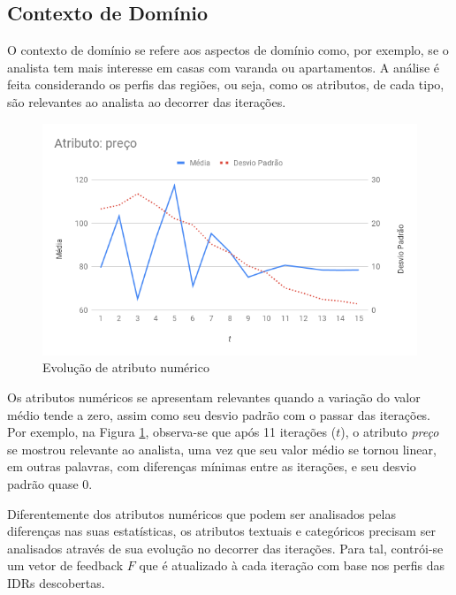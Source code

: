 
\subsection{Contexto de Domínio}

O contexto de domínio se refere aos aspectos de domínio como, por exemplo, se o analista tem mais interesse em casas com varanda ou apartamentos. A análise é feita considerando os perfis das regiões, ou seja, como os atributos, de cada tipo, são relevantes ao analista ao decorrer das iterações.

\begin{figure}[]
	\centering
	\includegraphics[width=\textwidth]{imagens/analise-atributo-numerico}
	\caption{Evolução de atributo numérico}
	\label{fig:analise-atributo-numerico}
\end{figure}

Os atributos numéricos se apresentam relevantes quando a variação do valor médio tende a zero, assim como seu desvio padrão com o passar das iterações. Por exemplo, na Figura \ref{fig:analise-atributo-numerico}, observa-se que após 11 iterações ($t$), o atributo {\em preço} se mostrou relevante ao analista, uma vez que seu valor médio se tornou linear, em outras palavras, com diferenças mínimas entre as iterações, e seu desvio padrão quase 0.


Diferentemente dos atributos numéricos que podem ser analisados pelas diferenças nas suas estatísticas, os atributos textuais e categóricos precisam ser analisados através de sua evolução no decorrer das iterações. Para tal, contrói-se um vetor de feedback $F$ que é atualizado à cada iteração com base nos perfis das IDRs descobertas.

